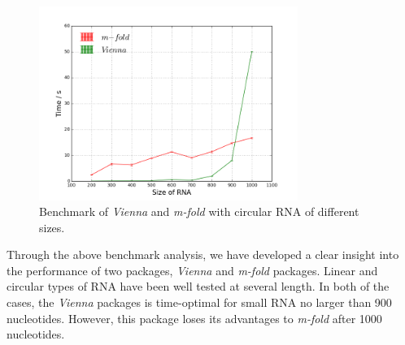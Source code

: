 \documentclass[12pt]{article}
\begin{document}
\begin{figure}[htbp!]
\centering
\includegraphics[width=0.75\textwidth]{c-m-v.png}
\caption{Benchmark of \textit{Vienna} and \textit{m-fold} with circular RNA of different sizes.}
\end{figure}

Through the above benchmark analysis, we have developed a clear insight into the performance of two packages, \textit{Vienna} and \textit{m-fold} packages. Linear and circular types of RNA have been well tested at several length. In both of the cases, the \textit{Vienna} packages is time-optimal for small RNA no larger than 900 nucleotides. However, this package loses its advantages to \textit{m-fold} after 1000 nucleotides.
\end{document}
